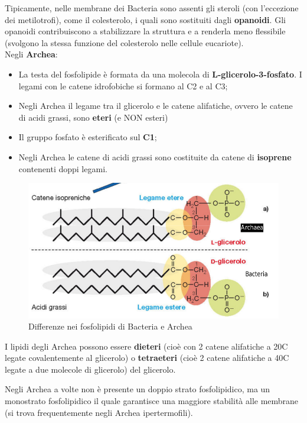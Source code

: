 \documentclass[11pt]{book}
\begin{document}
\vspace{1em}
Tipicamente, nelle membrane dei Bacteria sono assenti gli steroli (con l'eccezione dei metilotrofi), come il colesterolo, i quali sono sostituiti dagli \textbf{opanoidi}.
Gli opanoidi contribuiscono a stabilizzare la struttura e a renderla meno flessibile (svolgono la stessa funzione del colesterolo nelle cellule eucariote).\\

\clearpage
Negli \textbf{Archea}:
\begin{itemize}
\item La testa del fosfolipide è formata da una molecola di \textbf{L-glicerolo-3-fosfato}. I legami con le catene idrofobiche si formano al C2 e al C3;
\item Negli Archea il legame tra il glicerolo e le catene alifatiche, ovvero le catene di acidi grassi, sono \textbf{eteri} (e NON esteri)
\item Il gruppo fosfato è esterificato sul \textbf{C1};
\item Negli Archea le catene di acidi grassi sono costituite da catene di \textbf{isoprene} contenenti doppi legami.
\end{itemize}


\begin{figure}[htp]
\centering
\includegraphics[scale=0.3]{img/Fosfolipidi.png}
\caption{Differenze nei fosfolipidi di Bacteria e Archea}
\label{}
\end{figure}

\vspace{1em}
I lipidi degli Archea possono essere \textbf{dieteri} (cioè con 2 catene alifatiche a 20C legate covalentemente al glicerolo) o \textbf{tetraeteri} (cioè 2 catene alifatiche a 40C legate a due molecole di glicerolo) del glicerolo. 

Negli Archea a volte non è presente un doppio strato fosfolipidico, ma un monostrato fosfolipidico il quale garantisce una maggiore stabilità alle membrane (si trova frequentemente negli Archea ipertermofili).
\end{document}
